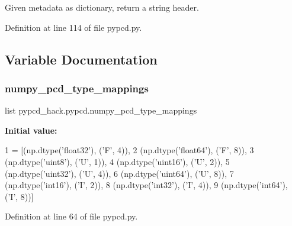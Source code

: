 \begin{DoxyVerb}Given metadata as dictionary, return a string header.
\end{DoxyVerb}
 

Definition at line 114 of file pypcd.\+py.



\subsection{Variable Documentation}
\mbox{\label{namespacepypcd__hack_1_1pypcd_ab54a3cdde97e8eebd16c78c8c0e7be95}} 
\subsubsection{\texorpdfstring{numpy\+\_\+pcd\+\_\+type\+\_\+mappings}{numpy\_pcd\_type\_mappings}}
{\footnotesize\ttfamily list pypcd\+\_\+hack.\+pypcd.\+numpy\+\_\+pcd\+\_\+type\+\_\+mappings}

{\bfseries Initial value\+:}
\begin{DoxyCode}
1 =  [(np.dtype(\textcolor{stringliteral}{'float32'}), (\textcolor{stringliteral}{'F'}, 4)),
2                            (np.dtype(\textcolor{stringliteral}{'float64'}), (\textcolor{stringliteral}{'F'}, 8)),
3                            (np.dtype(\textcolor{stringliteral}{'uint8'}), (\textcolor{stringliteral}{'U', 1)),}
4 \textcolor{stringliteral}{                           (np.dtype('uint16'}), (\textcolor{stringliteral}{'U', 2)),}
5 \textcolor{stringliteral}{                           (np.dtype('uint32'}), (\textcolor{stringliteral}{'U', 4)),}
6 \textcolor{stringliteral}{                           (np.dtype('uint64'}), (\textcolor{stringliteral}{'U', 8)),}
7 \textcolor{stringliteral}{                           (np.dtype('int16'}), (\textcolor{stringliteral}{'I'}, 2)),
8                            (np.dtype(\textcolor{stringliteral}{'int32'}), (\textcolor{stringliteral}{'I'}, 4)),
9                            (np.dtype(\textcolor{stringliteral}{'int64'}), (\textcolor{stringliteral}{'I'}, 8))]
\end{DoxyCode}


Definition at line 64 of file pypcd.\+py.

